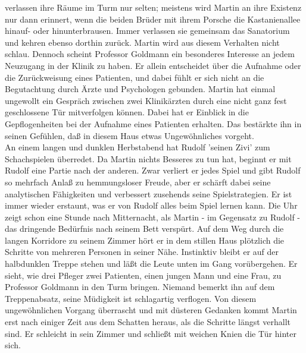 verlassen ihre R\"aume im Turm nur selten; meistens wird Martin an ihre
Existenz nur dann erinnert, wenn die beiden Br\"uder mit ihrem Porsche die
Kastanienallee hinauf- oder hinunterbrausen. Immer verlassen sie gemeinsam das
Sanatorium und kehren ebenso dorthin zur\"uck. Martin wird aus diesem Verhalten
nicht schlau. Dennoch scheint Professor Goldmann ein besonderes Interesse an
jedem Neuzugang in der Klinik zu haben. Er allein entscheidet \"uber die
Aufnahme oder die Zur\"uckweisung eines Patienten, und dabei f\"uhlt er sich
nicht an die Begutachtung durch \"Arzte und Psychologen gebunden. Martin hat
einmal ungewollt ein Gespr\"ach zwischen zwei Klinik\"arzten durch eine nicht
ganz fest geschlossene T\"ur mitverfolgen k\"onnen. Dabei hat er Einblick
in die Gepflogenheiten bei der Aufnahme eines Patienten erhalten. Das
best\"arkte ihn in seinen Gef\"uhlen, da{\ss} in diesem Haus etwas
Ungew\"ohnliches vorgeht. \\
\[\]
An einem langen und dunklen Herbstabend hat Rudolf 'seinen Zivi' zum
Schachspielen \"uberredet. Da Martin nichts Besseres zu tun hat, beginnt er
mit Rudolf eine Partie nach der anderen. Zwar verliert er jedes Spiel und
gibt Rudolf so mehrfach Anla{\ss} zu hemmungsloser Freude, aber er sch\"arft
dabei seine analytischen F\"ahigkeiten und verbessert zusehends seine
Spielstrategien. Er ist immer wieder erstaunt, was er von Rudolf alles beim
Spiel lernen kann. Die Uhr zeigt schon eine Stunde nach Mitternacht, als
Martin - im Gegensatz zu Rudolf - das dringende Bed\"urfnis nach seinem Bett
versp\"urt. Auf dem Weg durch die langen Korridore zu seinem Zimmer h\"ort er
in dem stillen Haus pl\"otzlich die Schritte von mehreren Personen in seiner
N\"ahe. Instinktiv bleibt er auf der halbdunklen Treppe stehen und l\"a{\ss}t
die Leute unten im Gang vor\"ubergehen. Er sieht, wie drei Pfleger zwei
Patienten, einen jungen Mann und eine Frau, zu Professor Goldmann in den Turm
bringen. Niemand bemerkt ihn auf dem Treppenabsatz, seine M\"udigkeit ist
schlagartig verflogen. Von diesem ungew\"ohnlichen Vorgang \"uberrascht und mit
d\"usteren Gedanken kommt Martin erst nach einiger Zeit aus dem Schatten heraus,
als die Schritte l\"angst verhallt sind. Er schleicht in sein Zimmer und
schlie{\ss}t mit weichen Knien die T\"ur hinter sich.
